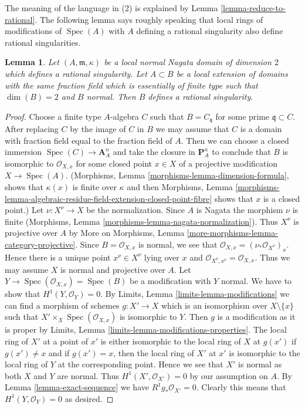 \documentclass{stacks-project}
\theoremstyle{plain}
\newtheorem{lemma}[subsection]{Lemma}
\theoremstyle{definition}
\theoremstyle{remark}
\numberwithin{equation}{subsection}
\def\Spec{\mathop{\mathrm{Spec}}}
\begin{document}
\noindent
The meaning of the language in (2) is explained by
Lemma \ref{lemma-reduce-to-rational}. The following lemma
says roughly speaking that local rings of modifications of $\Spec(A)$
with $A$ defining a rational singularity also define rational
singularities.

\begin{lemma}
\label{lemma-rational-propagates}
Let $(A, \mathfrak m, \kappa)$ be a local normal Nagata domain of
dimension $2$ which defines a rational singularity. Let $A \subset B$
be a local extension of domains with the same fraction field
which is essentially of finite type such
that $\dim(B) = 2$ and $B$ normal. Then $B$ defines a rational singularity.
\end{lemma}

\begin{proof}
Choose a finite type $A$-algebra $C$ such that $B = C_\mathfrak q$
for some prime $\mathfrak q \subset C$. After replacing
$C$ by the image of $C$ in $B$ we may assume that $C$ is a domain
with fraction field equal to the fraction field of $A$.
Then we can choose a closed immersion $\Spec(C) \to \mathbf{A}^n_A$
and take the closure in $\mathbf{P}^n_A$ to conclude that $B$
is isomorphic to $\mathcal{O}_{X, x}$ for some closed point $x \in X$
of a projective modification $X \to \Spec(A)$.
(Morphisms, Lemma \ref{morphisms-lemma-dimension-formula},
shows that $\kappa(x)$ is finite over $\kappa$ and then
Morphisms, Lemma
\ref{morphisms-lemma-algebraic-residue-field-extension-closed-point-fibre}
shows that $x$ is a closed point.)
Let $\nu : X^\nu \to X$ be the normalization.
Since $A$ is Nagata the morphism $\nu$ is finite (Morphisms, Lemma
\ref{morphisms-lemma-nagata-normalization}).
Thus $X^\nu$ is projective over $A$ by
More on Morphisms, Lemma
\ref{more-morphisms-lemma-category-projective}.
Since $B = \mathcal{O}_{X, x}$ is normal, we see that
$\mathcal{O}_{X, x} = (\nu_*\mathcal{O}_{X^\nu})_x$.
Hence there is a unique point $x^\nu \in X^\nu$ lying over $x$
and $\mathcal{O}_{X^\nu, x^\nu} = \mathcal{O}_{X, x}$.
Thus we may assume $X$ is normal and projective over $A$.
Let $Y \to \Spec(\mathcal{O}_{X, x}) = \Spec(B)$
be a modification with $Y$ normal.
We have to show that $H^1(Y, \mathcal{O}_Y) = 0$. By
Limits, Lemma \ref{limits-lemma-modifications}
we can find a morphism of schemes $g : X' \to X$ which is an isomorphism
over $X \setminus \{x\}$ such that $X' \times_X \Spec(\mathcal{O}_{X, x})$
is isomorphic to $Y$. Then $g$ is a modification as it is proper by
Limits, Lemma \ref{limits-lemma-modifications-properties}.
The local ring of $X'$ at a point of $x'$ is either isomorphic
to the local ring of $X$ at $g(x')$ if $g(x') \not = x$ and
if $g(x') = x$, then the local ring of $X'$ at $x'$ is isomorphic
to the local ring of $Y$ at the corresponding point. Hence we see
that $X'$ is normal as both $X$ and $Y$ are normal.
Thus $H^1(X', \mathcal{O}_{X'}) = 0$ by our assumption on $A$.
By Lemma \ref{lemma-exact-sequence} we have $R^1g_*\mathcal{O}_{X'} = 0$.
Clearly this means that $H^1(Y, \mathcal{O}_Y) = 0$ as desired.
\end{proof}
\end{document}
